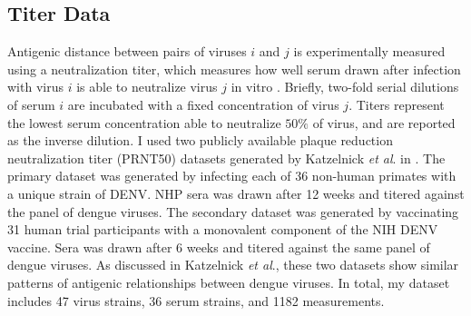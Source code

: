 \subsection*{Titer Data}

Antigenic distance between pairs of viruses $i$ and $j$ is experimentally measured using a neutralization titer, which measures how well serum drawn after infection with virus $i$ is able to neutralize virus $j$ in vitro \citep{russell1967dengue}.
Briefly, two-fold serial dilutions of serum $i$ are incubated with a fixed concentration of virus $j$.
Titers represent the lowest serum concentration able to neutralize $50\%$ of virus, and are reported as the inverse dilution.
I used two publicly available plaque reduction neutralization titer (PRNT50) datasets generated by Katzelnick \textit{et al}. in \citep{katzelnick2015dengue}.
The primary dataset was generated by infecting each of 36 non-human primates with a unique strain of DENV.
NHP sera was drawn after 12 weeks and titered against the panel of dengue viruses.
The secondary dataset was generated by vaccinating 31 human trial participants with a monovalent component of the NIH DENV vaccine.
Sera was drawn after 6 weeks and titered against the same panel of dengue viruses.
As discussed in Katzelnick \textit{et al}., these two datasets show similar patterns of antigenic relationships between dengue viruses.
In total, my dataset includes 47 virus strains, 36 serum strains, and 1182 measurements.

